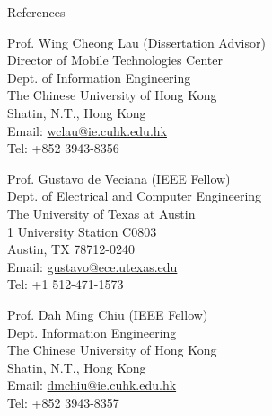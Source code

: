 \documentclass{resume} %
\providecommand*\email[1]{\href{mailto:#1}{#1}}
\begin{document}
\begin{rSection}{References}
\item[] Prof. Wing Cheong Lau (Dissertation Advisor)\\
Director of Mobile Technologies Center\\
Dept. of Information Engineering\\
The Chinese University of Hong Kong\\
Shatin, N.T., Hong Kong \\
Email: \email{wclau@ie.cuhk.edu.hk} \\
Tel: +852 3943-8356 \\

\item[] Prof. Gustavo de Veciana (IEEE Fellow)\\
Dept. of Electrical and Computer Engineering\\
The University of Texas at Austin\\
1 University Station C0803\\
Austin, TX 78712-0240 \\
Email: \email{gustavo@ece.utexas.edu} \\
Tel: +1 512-471-1573 \\


\item[] Prof. Dah Ming Chiu (IEEE Fellow)\\
Dept. Information Engineering\\
The Chinese University of Hong Kong\\
Shatin, N.T., Hong Kong\\
Email: \email{dmchiu@ie.cuhk.edu.hk}\\
Tel: +852 3943-8357
\end{rSection}




\end{document}
